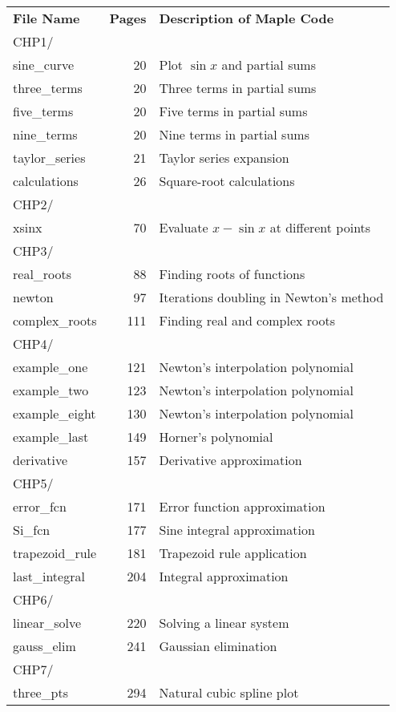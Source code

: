 \begin{center}
\begin{tabular}{l@{\quad}r@{\qquad}l}
{\bf File Name} & {\bf Pages} 
&{\bf Description of Maple Code} \\[0.1in]
CHP1/\\
\quad sine\_curve&20&Plot $\sin x$ and partial sums\\
\quad three\_terms&20&Three terms in partial sums\\
\quad five\_terms&20&Five terms in partial sums\\
\quad nine\_terms&20&Nine terms in partial sums\\
\quad taylor\_series&21&Taylor series expansion\\
\quad calculations&26&Square-root calculations\\
CHP2/\\
\quad xsinx&70&Evaluate $x - \sin x$ at different points\\
CHP3/\\
\quad real\_roots&88&Finding roots of functions\\
\quad newton&97&Iterations doubling in Newton's method\\
\quad complex\_roots&111&Finding real and complex roots\\
CHP4/\\
\quad example\_one&121&Newton's interpolation polynomial\\
\quad example\_two&123&Newton's interpolation polynomial\\
\quad example\_eight&130&Newton's interpolation polynomial\\
\quad example\_last&149&Horner's polynomial\\
\quad derivative&157&Derivative approximation\\
CHP5/\\
\quad error\_fcn&171&Error function approximation\\
\quad Si\_fcn&177&Sine integral approximation\\
\quad trapezoid\_rule&181&Trapezoid rule application\\
\quad last\_integral&204&Integral approximation\\
CHP6/\\
\quad linear\_solve&220&Solving a linear system\\
\quad gauss\_elim&241&Gaussian elimination\\
CHP7/\\
\quad three\_pts&294&Natural cubic spline plot\\

\end{tabular}
\end{center}
